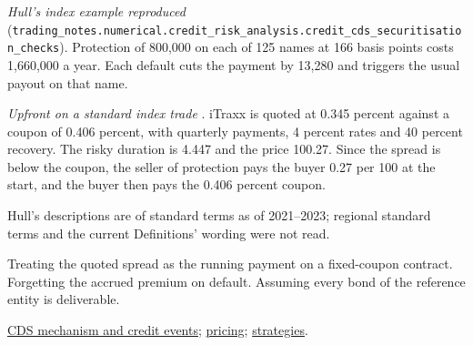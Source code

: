 \begin{qfdefinition}
 \emph{Hull's index example reproduced} (\nolinkurl{trading_notes.numerical.credit_risk_analysis.credit_cds_securitisation_checks}). Protection of 800,000 on each of 125 names at 166 basis points costs 1,660,000 a year. Each default cuts the payment by 13,280 and triggers the usual payout on that name.

\emph{Upfront on a standard index trade} \citep[Example~25.1]{s7-hulloptions}. iTraxx is quoted at 0.345 percent against a coupon of 0.406 percent, with quarterly payments, 4 percent rates and 40 percent recovery. The risky duration is 4.447 and the price 100.27. Since the spread is below the coupon, the seller of protection pays the buyer 0.27 per 100 at the start, and the buyer then pays the 0.406 percent coupon.

 Hull's descriptions are of standard terms as of 2021--2023; regional standard terms and the current Definitions' wording were not read.

 Treating the quoted spread as the running payment on a fixed-coupon contract. Forgetting the accrued premium on default. Assuming every bond of the reference entity is deliverable.

 \hyperref[mech:cds-contract-credit-events]{CDS mechanism and credit events}; \hyperref[meth:cds-pricing]{pricing}; \hyperref[meth:cds-strategies]{strategies}.

\end{qfdefinition}

